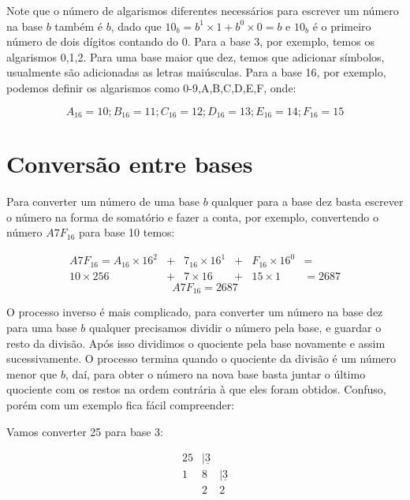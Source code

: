 \documentclass{report}
\theoremstyle{definition}
\begin{document}
Note que o número de algarismos diferentes necessários para escrever um número na base $b$ também é $b$, dado que $10_b = b^1 \times 1 + b^0 \times 0 = b$ e $10_b$ é o primeiro número de dois dígitos contando do 0. Para a base 3, por exemplo, temos os algarismos 0,1,2. Para uma base maior que dez, temos que adicionar símbolos, usualmente são adicionadas as letras maiúsculas. Para a base 16, por exemplo, podemos definir os algarismos como 0-9,A,B,C,D,E,F, onde:

\begin{equation*}
A_{16} = 10; B_{16} = 11; C_{16} = 12; D_{16} = 13; E_{16} = 14; F_{16} = 15
\end{equation*}

\section{Conversão entre bases}

Para converter um número de uma base $b$ qualquer para a base dez basta escrever o número na forma de somatório e fazer a conta, por exemplo, convertendo o número $A7F_{16}$ para base 10 temos:

\begin{align*}
A7F_{16} = A_{16} \times 16^2 & + & 7_{16} \times 16^1 & + & F_{16} \times 16^0 & = \\
10 \times 256 & + & 7 \times 16 & + & 15 \times 1 & = 2687
\end{align*}
\begin{equation*}
A7F_{16} = 2687
\end{equation*}

O processo inverso é mais complicado, para converter um número na base dez para uma base $b$ qualquer precisamos dividir o número pela base, e guardar o resto da divisão. Após isso dividimos o quociente pela base novamente e assim sucessivamente. O processo termina quando o quociente da divisão é um número menor que $b$, daí, para obter o número na nova base basta juntar o último quociente com os restos na ordem contrária à que eles foram obtidos. Confuso, porém com um exemplo fica fácil compreender:

Vamos converter 25 para base 3:

\[
    \begin{array}{rrr}
        25& |\underline{3}&   \\
         1&              8& |\underline{3}\\
          &              2&              2
    \end{array}
\]
\end{document}
